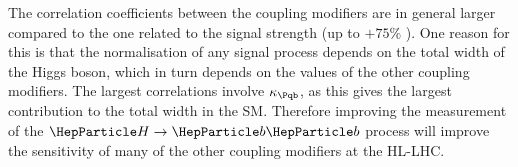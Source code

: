 


The correlation coefficients between the coupling modifiers are in general larger compared to the one related to the signal strength (up to $+75\%$ ). One reason for this is that the normalisation of any signal process depends on the total width of the Higgs boson, which in turn depends on the values of the other coupling modifiers. The largest correlations involve $\kb$, as this gives the largest contribution to the total width in the SM. Therefore improving the measurement of the $\hbb$ process will improve the sensitivity of many of the other coupling modifiers at the HL-LHC.




